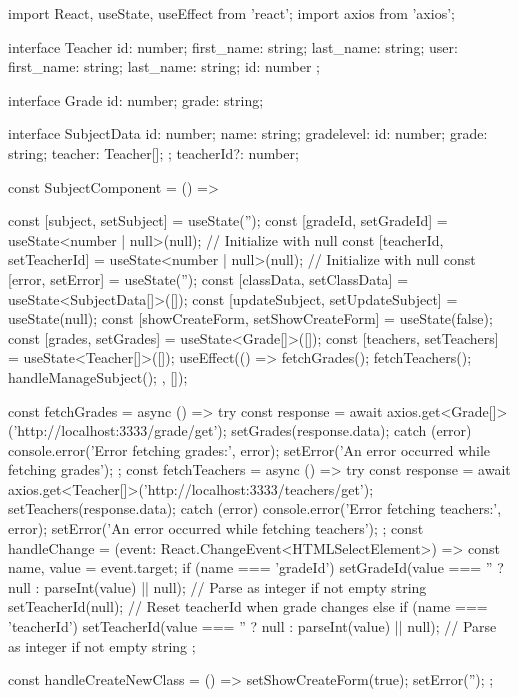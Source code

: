 import React, { useState, useEffect } from 'react';
import axios from 'axios';

interface Teacher {
  id: number;
  first_name: string;
  last_name: string;
  user: { first_name: string; last_name: string; id: number };
}

interface Grade {
  id: number;
  grade: string;
}

interface SubjectData {
  id: number;
  name: string;
  gradelevel: {
    id: number;
    grade: string;
    teacher: Teacher[];
  };
  teacherId?: number;
}

const SubjectComponent = () => {
  const [subject, setSubject] = useState('');
  const [gradeId, setGradeId] = useState<number | null>(null); // Initialize with null
  const [teacherId, setTeacherId] = useState<number | null>(null); // Initialize with null
  const [error, setError] = useState('');
  const [classData, setClassData] = useState<SubjectData[]>([]);
  const [updateSubject, setUpdateSubject] = useState(null);
  const [showCreateForm, setShowCreateForm] = useState(false);
  const [grades, setGrades] = useState<Grade[]>([]);
  const [teachers, setTeachers] = useState<Teacher[]>([]);
  useEffect(() => {
    fetchGrades();
    fetchTeachers();
    handleManageSubject();
  }, []);




  const fetchGrades = async () => {
    try {
      const response = await axios.get<Grade[]>('http://localhost:3333/grade/get');
      setGrades(response.data);
    } catch (error) {
      console.error('Error fetching grades:', error);
      setError('An error occurred while fetching grades');
    }
  };
  const fetchTeachers = async () => {
    try {
      const response = await axios.get<Teacher[]>('http://localhost:3333/teachers/get');
      setTeachers(response.data);
    } catch (error) {
      console.error('Error fetching teachers:', error);
      setError('An error occurred while fetching teachers');
    }
  };
  const handleChange = (event: React.ChangeEvent<HTMLSelectElement>) => {
    const { name, value } = event.target;
    if (name === 'gradeId') {
      setGradeId(value === '' ? null : parseInt(value) || null); // Parse as integer if not empty string
      setTeacherId(null); // Reset teacherId when grade changes
    } else if (name === 'teacherId') {
      setTeacherId(value === '' ? null : parseInt(value) || null); // Parse as integer if not empty string
    }
  };

  const handleCreateNewClass = () => {
    setShowCreateForm(true);
    setError('');
  };

}
